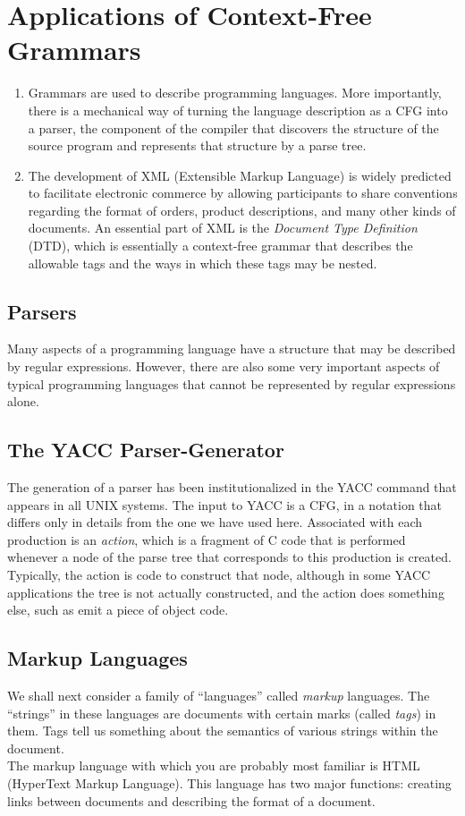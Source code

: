 \documentclass[]{article}
\begin{document}
\section*{Applications of Context-Free Grammars}
  \begin{enumerate}
    \item Grammars are used to describe programming languages. More importantly,
    there is a mechanical way of turning the language description as a CFG into
    a parser, the component of the compiler that discovers the structure of the
    source program and represents that structure by a parse tree.
    \item The development of XML (Extensible Markup Language) is widely
    predicted to facilitate electronic commerce by allowing participants to
    share conventions regarding the format of orders, product descriptions, and
    many other kinds of documents. An essential part of XML is the
    \emph{Document Type Definition} (DTD), which is essentially a context-free
    grammar that describes the allowable tags and the ways in which these tags
    may be nested.
  \end{enumerate}

  \subsection*{Parsers}
    Many aspects of a programming language have a structure that may be
    described by regular expressions. However, there are also some very
    important aspects of typical programming languages that cannot be
    represented by regular expressions alone.

  \subsection*{The YACC Parser-Generator}
    The generation of a parser has been institutionalized in the YACC command
    that appears in all UNIX systems. The input to YACC is a CFG, in a notation
    that differs only in details from the one we have used here. Associated with
    each production is an \emph{action}, which is a fragment of C code that is
    performed whenever a node of the parse tree that corresponds to this
    production is created. Typically, the action is code to construct that node,
    although in some YACC applications the tree is not actually constructed, and
    the action does something else, such as emit a piece of object code.

  \subsection*{Markup Languages}
    We shall next consider a family of ``languages'' called \emph{markup}
    languages. The ``strings'' in these languages are documents with certain
    marks (called \emph{tags}) in them. Tags tell us something about the
    semantics of various strings within the document. \\
    \indent The markup language with which you are probably most familiar is
    HTML (HyperText Markup Language). This language has two major functions:
    creating links between documents and describing the format of a document.
\end{document}
